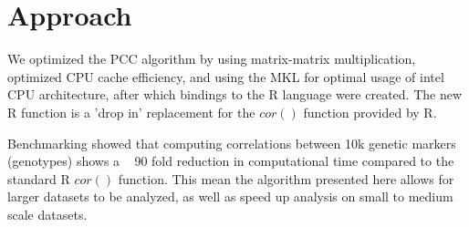 \documentclass{bioinfo}
\begin{document}
\section{Approach}
We optimized the PCC algorithm by using matrix-matrix multiplication, 
optimized CPU cache efficiency, and using the MKL \citep{Intel2007, Wang2014} 
for optimal usage of intel CPU architecture, after which bindings to the R language 
were created. The new R function is a 'drop in' replacement for the 
$cor()$ function provided by R.

Benchmarking showed that computing correlations between 10k genetic markers 
(genotypes) shows a ~ 90 fold reduction in computational time compared to 
the standard R $cor()$ function. This mean the algorithm presented here
allows for larger datasets to be analyzed, as well as speed up analysis on 
small to medium scale datasets.
\end{document}
